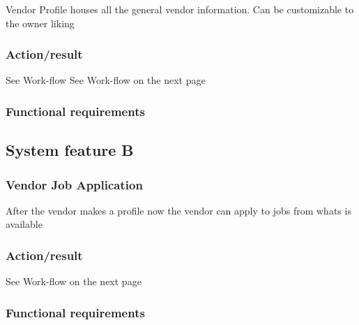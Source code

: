 \documentclass[10pt]{article}
\begin{document}
Vendor Profile houses all the general vendor information. Can be customizable to the owner liking

\subsubsection{Action/result}

See Work-flow See Work-flow on the next page



\subsubsection{ Functional requirements}

\lipsum[10]






\subsection{System feature B}

\subsubsection{Vendor Job Application}

After the vendor makes a profile now the vendor can apply to jobs from whats is available

\subsubsection{Action/result}

See Work-flow on the next page



\subsubsection{ Functional requirements}

\lipsum[10]
\end{document}
